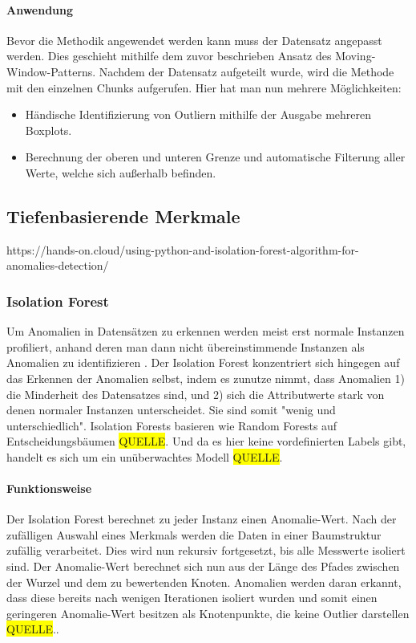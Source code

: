 \paragraph{Anwendung}
Bevor die Methodik angewendet werden kann muss der Datensatz angepasst werden. Dies geschieht mithilfe dem zuvor beschrieben Ansatz des Moving-Window-Patterns. Nachdem der Datensatz aufgeteilt wurde, wird die Methode mit den einzelnen Chunks aufgerufen. Hier hat man nun mehrere Möglichkeiten: 
\begin{itemize}
	\item Händische Identifizierung von Outliern mithilfe der Ausgabe mehreren Boxplots.
	\item Berechnung der oberen und unteren Grenze und automatische Filterung aller Werte, welche sich außerhalb befinden.
\end{itemize}

\newpage

\subsection{Tiefenbasierende Merkmale}
https://hands-on.cloud/using-python-and-isolation-forest-algorithm-for-anomalies-detection/
\subsubsection{Isolation Forest}
Um Anomalien in Datensätzen zu erkennen werden meist erst normale Instanzen profiliert, anhand deren man dann nicht übereinstimmende Instanzen als Anomalien zu identifizieren \cite{liuIsolationForest2008}. Der Isolation Forest konzentriert sich hingegen auf das Erkennen der Anomalien selbst, indem es zunutze nimmt, dass Anomalien 1) die Minderheit des Datensatzes sind, und 2) sich die Attributwerte stark von denen normaler Instanzen unterscheidet. Sie sind somit "wenig und unterschiedlich"\cite{liuIsolationForest2008}. Isolation Forests basieren wie Random Forests auf Entscheidungsbäumen \colorbox{yellow}{QUELLE}. Und da es hier keine vordefinierten Labels gibt, handelt es sich um ein unüberwachtes Modell \colorbox{yellow}{QUELLE}.
\paragraph{Funktionsweise}
Der Isolation Forest berechnet zu jeder Instanz einen Anomalie-Wert. Nach der zufälligen Auswahl eines Merkmals werden die Daten in einer Baumstruktur zufällig verarbeitet. Dies wird nun rekursiv fortgesetzt, bis alle Messwerte isoliert sind. Der Anomalie-Wert berechnet sich nun aus der Länge des Pfades zwischen der Wurzel und dem zu bewertenden Knoten. Anomalien werden daran erkannt, dass diese bereits nach wenigen Iterationen isoliert wurden und somit einen geringeren Anomalie-Wert besitzen als Knotenpunkte, die keine Outlier darstellen \colorbox{yellow}{QUELLE}..
